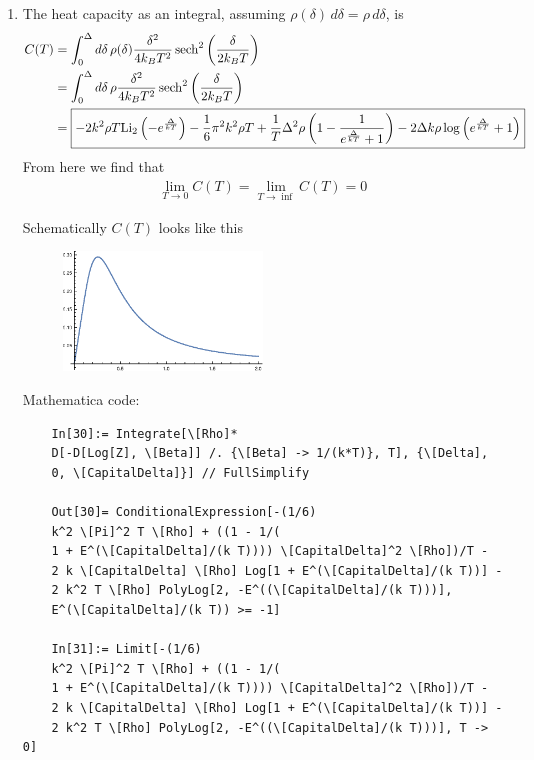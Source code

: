 \documentclass{article}
\theoremstyle{definition}
\newcommand{\f}[2]{\frac{#1}{#2}}
\newcommand{\lp}{\left(}
\newcommand{\rp}{\right)}
\begin{document}
\begin{enumerate}[label=(\alph*)]
	\item The heat capacity as an integral, assuming $\rho(\delta)\,d\delta = \rho \,d\delta$, is 
	\begin{align*}
	C(T) 
	&= \int_0^\Delta d\delta\, \rho(\delta) \f{\delta^2}{4k_BT^2}\sech^2\lp \f{\delta}{2k_BT} \rp \\
	&= \int_0^\Delta d\delta\, \rho \f{\delta^2}{4k_BT^2}\sech^2\lp \f{\delta}{2k_BT} \rp \\
	&= \boxed{-2 k^2 \rho  T \text{Li}_2\left(-e^{\frac{\Delta }{k T}}\right)-\frac{1}{6} \pi^2 k^2 \rho  T+\f{1}{T}\Delta ^2 \rho  \left(1-\frac{1}{e^{\frac{\Delta }{kT}}+1}\right)-2 \Delta  k \rho  \log \left(e^{\frac{\Delta }{k T}}+1\right)}
	\end{align*}
	From here we find that
	\begin{align*}
	\boxed{\lim_{T\to 0}C(T) = \lim_{T\to \inf} C(T) = 0}
	\end{align*}
	
	
	
	Schematically $C(T)$ looks like this 
	\begin{figure}[!htb]
		\centering
		\includegraphics[width=0.5\textwidth]{problem10.eps}
	\end{figure}



	Mathematica code:
	\begin{lstlisting}
	In[30]:= Integrate[\[Rho]*
	D[-D[Log[Z], \[Beta]] /. {\[Beta] -> 1/(k*T)}, T], {\[Delta], 
	0, \[CapitalDelta]}] // FullSimplify
	
	Out[30]= ConditionalExpression[-(1/6)
	k^2 \[Pi]^2 T \[Rho] + ((1 - 1/(
	1 + E^(\[CapitalDelta]/(k T)))) \[CapitalDelta]^2 \[Rho])/T - 
	2 k \[CapitalDelta] \[Rho] Log[1 + E^(\[CapitalDelta]/(k T))] - 
	2 k^2 T \[Rho] PolyLog[2, -E^((\[CapitalDelta]/(k T)))], 
	E^(\[CapitalDelta]/(k T)) >= -1]
	
	In[31]:= Limit[-(1/6)
	k^2 \[Pi]^2 T \[Rho] + ((1 - 1/(
	1 + E^(\[CapitalDelta]/(k T)))) \[CapitalDelta]^2 \[Rho])/T - 
	2 k \[CapitalDelta] \[Rho] Log[1 + E^(\[CapitalDelta]/(k T))] - 
	2 k^2 T \[Rho] PolyLog[2, -E^((\[CapitalDelta]/(k T)))], T -> 0]
	

\end{lstlisting}
\end{enumerate}
\end{document}
